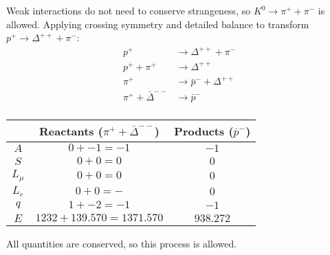 \documentclass{article}
\begin{document}
\problem
{}
Weak interactions do not need to conserve strangeness, so $K^{0} \to \pi^{+} + \pi^{-}$ is allowed.
Applying crossing symmetry and detailed balance to transform $p^{+} \to \Delta^{++} + \pi^{-}$:
\begin{equation}
    \begin{split}
        p^{+} & \to \Delta^{++} + \pi^{-} \\
        p^{+} + \pi^{+} & \to \Delta^{++} \\
        \pi^{+} & \to \bar{p}^{-} + \Delta^{++} \\
        \pi^{+} + \bar{\Delta}^{--} & \to \bar{p}^{-} \\
    \end{split}
\end{equation}
\begin{center}
\begin{tabular}{|c|c|c|}
    \hline
    & Reactants ($\pi^{+} + \bar{\Delta}^{--}$) & Products ($\bar{p}^{-}$) \\
    \hline
    $A$ & $0 + -1 = -1$ & $-1$ \\
    \hline
    $S$ & $0 + 0 = 0$ & $0$ \\
    \hline
    $L_{\mu}$ & $0 + 0 = 0$ & $0$ \\
    \hline
    $L_{e}$ & $0 + 0 = -$ & $0$ \\
    \hline
    $q$ & $1 + -2 = -1$ & $-1$ \\
    \hline
    $E$ & $1232 + 139.570 = 1371.570$ & $938.272$ \\
    \hline
\end{tabular}
\end{center}
All quantities are conserved, so this process is allowed.
\end{document}
